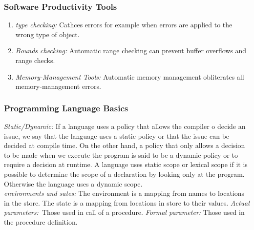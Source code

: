 \subsubsection{Software Productivity Tools}
\begin{enumerate}
	\item{\emph{type checking: } Cathces errors for example when errors are applied to the wrong type of object.} 
	\item{\emph{Bounds checking: } Automatic range checking can prevent buffer overflows and range checks. }
	\item{\emph{Memory-Management Tools:} Automatic memory management obliterates all memory-management errors. }
\end{enumerate}

\subsubsection{Programming Language Basics}
\emph{Static/Dynamic:} If a language uses a policy that allows the compiler o decide an issue, we say that the language uses a static policy or that the issue can be decided at compile time. On the other hand, a policy that only allows a decision to be made when we execute the program is said to be a dynamic policy or to require a decision at runtime. A language uses static scope or lexical scope if it is possible to determine the scope of a declaration by looking only at the program. Otherwise the language uses a dynamic scope. \\
\emph{environments and sates:} The environment is a mapping from names to locations in the store. The state is a mapping from locations in store to their values. 
\emph{Actual parameters:} Those used in call of a procedure. \emph{Formal parameter: } Those used in the procedure definition. 

 

